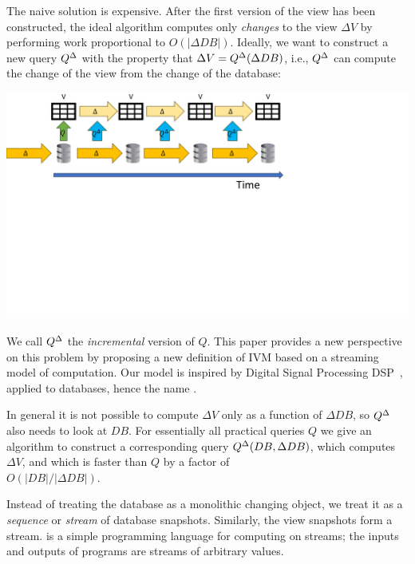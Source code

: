 The naive solution is expensive.  After the first version of the view
has been constructed, the ideal algorithm computes only \emph{changes}
to the view $\Delta V$ by performing work proportional to $O(|\Delta
DB|)$.  Ideally, we want to construct a new query ${Q}^{\Delta}$ with the
property that $\Delta V = {Q}^{\Delta}(\Delta DB)$, i.e., ${Q}^{\Delta}$ can
compute the change of the view from the change of the database:

\includegraphics[trim={0 4in 4in 0},clip,scale=.3]{incview.pdf}

We call ${Q}^{\Delta}$ the \emph{incremental} version of $Q$.  This paper
provides a new perspective on this problem by proposing a new
definition of IVM based on a streaming model of computation.  Our
model is inspired by Digital Signal Processing
DSP~\cite{rabiner-book75}, applied to databases, hence the name \dbsp.

In general it is not possible to compute $\Delta V$ only as a function
of $\Delta DB$, so ${Q}^{\Delta}$ also needs to look at $DB$.  For
essentially all practical queries $Q$ we give an algorithm to
construct a corresponding query ${Q}^{\Delta}(DB, \Delta DB)$, which
computes $\Delta V$, and which is faster than $Q$ by a factor of \\
$O(|DB| / |\Delta DB|)$.

Instead of treating the database as a monolithic changing object, we
treat it as a \emph{sequence} or \emph{stream} of database snapshots.
Similarly, the view snapshots form a stream.  \dbsp is a simple
programming language for computing on streams; the inputs and outputs
of \dbsp programs are streams of arbitrary values.


